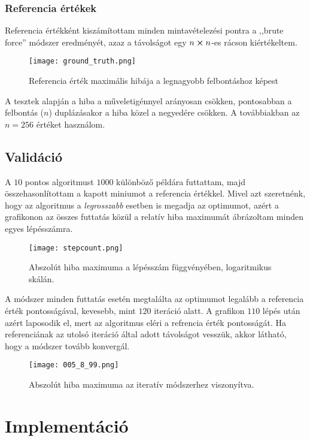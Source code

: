 \subsection{Referencia értékek}
Referencia értékként kiszámítottam minden mintavételezési pontra a ,,brute force'' módszer eredményét, azaz a távolságot egy $n\cross n$-es rácson kiértékeltem.
\begin{figure}[H]
	\centering
	\texttt{[image: ground\_truth.png]}
	\caption{Referencia érték maximális hibája a legnagyobb felbontáshoz képest}
\end{figure}
A tesztek alapján a hiba a műveletigénnyel arányosan csökken, pontosabban a felbontás ($n$) duplázásakor a hiba közel a negyedére csökken. A továbbiakban az $n=256$ értéket használom.



\section{Validáció}

A $10$ pontos algoritmust $1000$ különböző példára futtattam, majd összehasonlítottam a kapott miniumot a referencia értékkel. Mivel azt szeretnénk, hogy az algoritmus a \emph{legrosszabb} esetben is megadja az optimumot, azért a grafikonon az összes futtatás közül a relatív hiba maximumát ábrázoltam minden egyes lépésszámra.
\begin{figure}[H]
	\centering
	\texttt{[image: stepcount.png]}
	\caption{Abszolút hiba maximuma a lépésszám függvényében, logaritmikus skálán.}
\end{figure}
A módszer minden futtatás esetén megtalálta az optimumot legalább a referencia érték pontosságával, kevesebb, mint $120$ iteráció alatt. A grafikon $110$ lépés után azért laposodik el, mert az algoritmus eléri a refrencia érték pontosságát. Ha referenciának az utolsó iteráció által adott távolságot vesszük, akkor látható, hogy a módszer tovább konvergál.
\begin{figure}[H]
	\centering
	\texttt{[image: 005\_8\_99.png]}
	\caption{Abszolút hiba maximuma az iteratív módszerhez viszonyítva.}
\end{figure}





\chapter{Implementáció}
\label{ch:impl}

